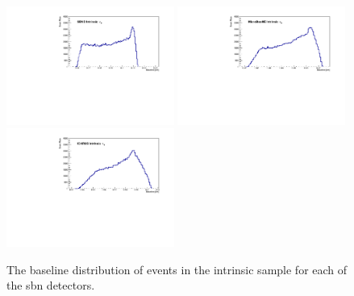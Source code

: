 \begin{figure}[!h]
    \centering
    \includegraphics[width = 0.49\textwidth]{figures-chap5/SBND_intrinsic_nue.pdf}
    \includegraphics[width = 0.49\textwidth]{figures-chap5/MicroBooNE_intrinsic_nue.pdf}
    \includegraphics[width = 0.49\textwidth]{figures-chap5/ICARUS_intrinsic_nue.pdf} 
    \captionsetup{width=0.45\textwidth}
    \parbox[b]{0.49\textwidth}%
    {
    \caption{The baseline distribution of events in the intrinsic \nue sample for each of the \gls{sbn} detectors. \\\phantom{.}\\}
    \label{fig:nue_intrinsic_baseline}
    }
  \end{figure}
  
